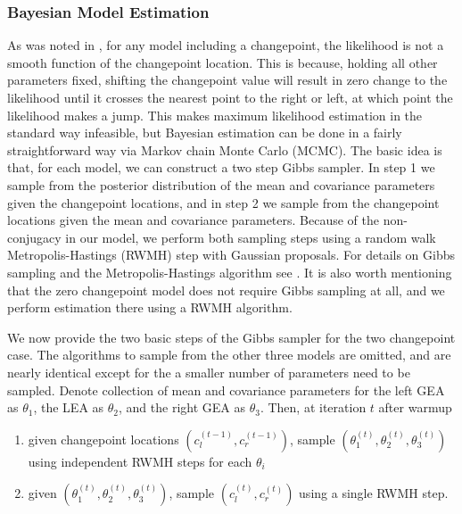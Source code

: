 \documentclass[12pt]{article}
\providecommand{\tightlist}{%
  \setlength{\itemsep}{0pt}\setlength{\parskip}{0pt}}
\begin{document}
\subsubsection{Bayesian Model Estimation}

As was noted in \citet{stephens1994}, for any model including a
changepoint, the likelihood is not a smooth function of the changepoint
location. This is because, holding all other parameters fixed, shifting
the changepoint value will result in zero change to the likelihood until
it crosses the nearest point to the right or left, at which point the
likelihood makes a jump. This makes maximum likelihood estimation in the
standard way infeasible, but Bayesian estimation can be done in a fairly
straightforward way via Markov chain Monte Carlo (MCMC). The basic idea
is that, for each model, we can construct a two step Gibbs sampler. In
step 1 we sample from the posterior distribution of the mean and
covariance parameters given the changepoint locations, and in step 2 we
sample from the changepoint locations given the mean and covariance
parameters. Because of the non-conjugacy in our model, we perform both
sampling steps using a random walk Metropolis-Hastings (RWMH) step with
Gaussian proposals. For details on Gibbs sampling and the
Metropolis-Hastings algorithm see \citet{gelman2013}. It is also worth
mentioning that the zero changepoint model does not require Gibbs
sampling at all, and we perform estimation there using a RWMH algorithm.

We now provide the two basic steps of the Gibbs sampler for the two
changepoint case. The algorithms to sample from the other three models
are omitted, and are nearly identical except for the a smaller number of
parameters need to be sampled. Denote collection of mean and covariance
parameters for the left GEA as \(\theta_1\), the LEA as \(\theta_2\),
and the right GEA as \(\theta_3\). Then, at iteration \(t\) after warmup

\begin{enumerate}
\def\labelenumi{\arabic{enumi}.}
\tightlist
\item
  given changepoint locations \((c_l^{(t - 1)}, c_r^{(t - 1)})\), sample
  \((\theta_1^{(t)}, \theta_2^{(t)}, \theta_3^{(t)})\) using independent
  RWMH steps for each \(\theta_i\)
\item
  given \((\theta_1^{(t)}, \theta_2^{(t)}, \theta_3^{(t)})\), sample
  \((c_l^{(t)}, c_r^{(t)})\) using a single RWMH step.
\end{enumerate}
\end{document}
